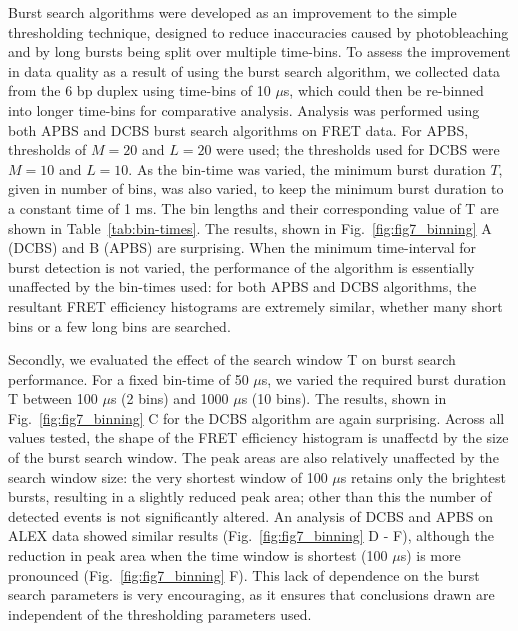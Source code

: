\documentclass[10pt]{article}
\begin{document}
Burst search algorithms were developed as an improvement to the simple thresholding technique, designed to reduce inaccuracies caused by photobleaching and by long bursts being split over multiple time-bins. To assess the improvement in data quality as a result of using the burst search algorithm, we collected data from the 6 bp duplex using time-bins of 10 $\mu$s, which could then be re-binned into longer time-bins for comparative analysis. Analysis was performed using both APBS and DCBS burst search algorithms on FRET data. For APBS, thresholds of $M=20$ and $L=20$ were used; the thresholds used for DCBS were $M = 10$ and $L = 10$. As the bin-time was varied, the minimum burst duration $T$, given in number of bins, was also varied, to keep the minimum burst duration to a constant time of 1 ms. The bin lengths and their corresponding value of T are shown in Table~\ref{tab:bin-times}. The results, shown in Fig.~\ref{fig:fig7_binning} A (DCBS) and B (APBS) are surprising. When the minimum time-interval for burst detection is not varied, the performance of the algorithm is essentially unaffected by the bin-times used: for both APBS and DCBS algorithms, the resultant FRET efficiency histograms are extremely similar, whether many short bins or a few long bins are searched.

Secondly, we evaluated the effect of the search window T on burst search performance. For a fixed bin-time of 50 $\mu$s, we varied the required burst duration T between 100 $\mu$s (2 bins) and 1000 $\mu$s (10 bins). The results, shown in Fig.~\ref{fig:fig7_binning} C for the DCBS algorithm are again surprising. Across all values tested, the shape of the FRET efficiency histogram is unaffectd by the size of the burst search window. The peak areas are also relatively unaffected by the search window size: the very shortest window of 100 $\mu$s retains only the brightest bursts, resulting in a slightly reduced peak area; other than this the number of detected events is not significantly altered. An analysis of DCBS and APBS on ALEX data showed similar results (Fig.~\ref{fig:fig7_binning} D - F), although the reduction in peak area when the time window is shortest (100 $\mu$s) is more pronounced (Fig.~\ref{fig:fig7_binning} F). This lack of dependence on the burst search parameters is very encouraging, as it ensures that conclusions drawn are independent of the thresholding parameters used.
\end{document}
